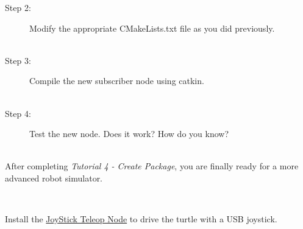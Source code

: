 \documentclass[12pt]{article}
\begin{document}
\begin{description}[labelindent=1cm]
\begin{description}
\begin{lstlisting}
	\end{lstlisting}
	
	
	\item [Step 2:] Modify the appropriate CMakeLists.txt file as you did previously. \\\\
	
	\item [Step 3:] Compile the new subscriber node using catkin. \\\\
	
	
	
	\item [Step 4:] Test the new node. Does it work? How do you know?\\
	
	

	\vspace*{5mm}
	


	\end{description}	
	
	
	

	\item[\textbf{\underline{Tutorial Complete:}}] \hfill \vspace{3mm}\\ After completing {\it Tutorial 4 - Create Package}, you are finally ready for a more advanced robot simulator.
	
	\hfill \vspace{3mm}\\
	
	\item [Bonus Excercise:] Install the \href{http://wiki.ros.org/joy/Tutorials/WritingTeleopNode}{JoyStick Teleop Node} to drive the turtle with a USB joystick.
	
	
	\end{description}
\end{document}
